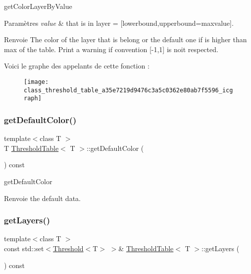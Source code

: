 get\+Color\+Layer\+By\+Value 


\begin{DoxyParams}{Paramètres}
{\em value} & that is in layer = \mbox{[}lowerbound,upperbound=maxvalue\mbox{]}. \\
\hline
\end{DoxyParams}
\begin{DoxyReturn}{Renvoie}
The color of the layer that is belong or the default one if is higher than max of the table. Print a warning if convention \mbox{[}-\/1,1\mbox{]} is noit respected. 
\end{DoxyReturn}
Voici le graphe des appelants de cette fonction \+:\nopagebreak
\begin{figure}[H]
\begin{center}
\leavevmode
\texttt{[image: class\_threshold\_table\_a35e7219d9476c3a5c0362e80ab7f5596\_icgraph]}
\end{center}
\end{figure}
\mbox{\label{class_threshold_table_ac20ccb2dd4cd20e96036818ca0106f93}} 
\subsubsection{\texorpdfstring{get\+Default\+Color()}{getDefaultColor()}}
{\footnotesize\ttfamily template$<$class T $>$ \\
T \hyperlink{class_threshold_table}{Threshold\+Table}$<$ T $>$\+::get\+Default\+Color (\begin{DoxyParamCaption}{ }\end{DoxyParamCaption}) const\hspace{0.3cm}{\ttfamily [inline]}}



get\+Default\+Color 

\begin{DoxyReturn}{Renvoie}
the default data. 
\end{DoxyReturn}
\mbox{\label{class_threshold_table_a6cb1745a571a4e071e9b74ad34372405}} 
\subsubsection{\texorpdfstring{get\+Layers()}{getLayers()}}
{\footnotesize\ttfamily template$<$class T $>$ \\
const std\+::set$<$\hyperlink{struct_threshold}{Threshold}$<$T$>$ $>$\& \hyperlink{class_threshold_table}{Threshold\+Table}$<$ T $>$\+::get\+Layers (\begin{DoxyParamCaption}{ }\end{DoxyParamCaption}) const\hspace{0.3cm}{\ttfamily [inline]}}



